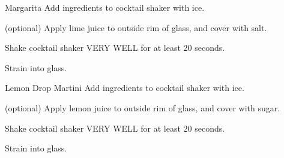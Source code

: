 \documentclass[]{article}
\begin{document}
\begin{recipe}{Margarita}{}{}
  Add ingredients to cocktail shaker with ice.

  (optional) Apply lime juice to outside rim of glass, and cover with salt.

  \newstep
  Shake cocktail shaker VERY WELL for at least 20 seconds.

  \newstep
  Strain into glass.
\end{recipe}

\begin{recipe}{Lemon Drop Martini}{}{}
  Add ingredients to cocktail shaker with ice.

  (optional) Apply lemon juice to outside rim of glass, and cover with sugar.

  \newstep
  Shake cocktail shaker VERY WELL for at least 20 seconds.

  \newstep
  Strain into glass.
\end{recipe}
\end{document}

